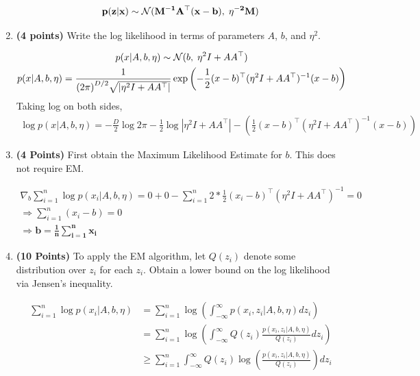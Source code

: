 \begin{enumerate}
\begin{soln}
    $$
        \mathbf{p(z|x)} \sim \mathcal{N}(\mathbf{M^{-1}A^\top(x-b)}, \; \mathbf{\eta^{-2}M})
    $$
\end{soln}

\item \textbf{(4 points)}
Write the log likelihood in terms of parameters $A$, $b$, and $\eta^2$.

\begin{soln}
    \begin{gather*}
        p(x|A,b,\eta) \sim \mathcal{N}(b, \; \eta^2I + AA^\top) \\
        p(x|A,b,\eta) = \frac{1}{{(2\pi)}^{D/2}\sqrt{|\eta^2I + AA^\top|}}\exp{\left(-\frac{1}{2}(x-b)^\top(\eta^2I + AA^\top)^{-1}(x-b)\right)}
    \end{gather*}
    Taking log on both sides,
    \begin{gather*}
        \log{p(x|A,b,\eta)} = -\frac{D}{2}\log{2\pi} -\frac{1}{2}\log{|\eta^2I + AA^\top|}-\left(\frac{1}{2}(x-b)^\top(\eta^2I + AA^\top)^{-1}(x-b)\right)
    \end{gather*}
\end{soln}

\item \textbf{(4 Points)}
First obtain the Maximum Likelihood Estimate for $b$. This does not require EM.

\begin{soln}
    \begin{gather*}
        \nabla_b\sum_{i=1}^n\log{p(x_i|A,b,\eta)} = 0+0-\sum_{i=1}^n2*\frac{1}{2}(x_i-b)^\top(\eta^2I + AA^\top)^{-1} = 0 \\
        \Rightarrow \sum_{i=1}^n(x_i-b)=0 \\
        \Rightarrow \mathbf{b = \frac{1}{n}\sum_{i=1}^nx_i}
    \end{gather*}
\end{soln}

\item \textbf{(10 Points)}
To apply the EM algorithm,
let $Q(z_i)$  denote some distribution over $z_i$ for each $z_i$.
Obtain a lower bound on the log likelihood via Jensen's inequality.

\begin{soln}
    \begin{align*}
        \sum_{i=1}^n\log{p(x_i|A,b,\eta)} &= \sum_{i=1}^n\log{\left(\int_{-\infty}^{\infty}p(x_i,z_i|A,b,\eta)dz_i\right)} \\
        &= \sum_{i=1}^n\log{\left(\int_{-\infty}^{\infty}Q(z_i)\frac{p(x_i,z_i|A,b,\eta)}{Q(z_i)}dz_i\right)} \\
        &\geq \sum_{i=1}^n\int_{-\infty}^{\infty}Q(z_i)\log{\left(\frac{p(x_i,z_i|A,b,\eta)}{Q(z_i)}\right)dz_i} \\
    \end{align*}
    

\end{soln}
\end{enumerate}
